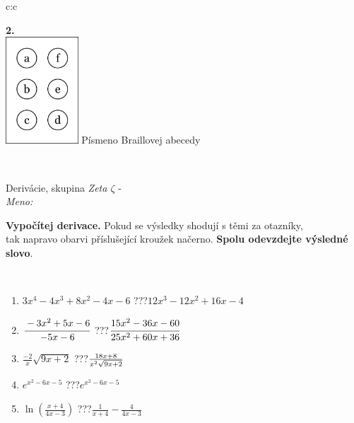 \documentclass[10pt]{report}
\begin{document}
\begin{tabular}{c:c}
\begin{minipage}[c][104.5mm][t]{0.5\linewidth}
\begin{center}
\begin{minipage}{0.20\linewidth}
\begin{center}
{\Huge\bfseries 2.} \\[2mm]
\includegraphics[height=40mm]{../images/braille.png}
{\small Písmeno Braillovej abecedy}
\end{center}
\end{minipage}
\end{center}
\end{minipage}
\\ \hdashline
\begin{minipage}[c][104.5mm][t]{0.5\linewidth}
\begin{center}
\vspace{7mm}
{\huge Derivácie, skupina \textit{Zeta $\zeta$} -}\\[5mm]
\textit{Meno:}\phantom{xxxxxxxxxxxxxxxxxxxxxxxxxxxxxxxxxxxxxxxxxxxxxxxxxxxxxxxxxxxxxxxxx}\\[5mm]
\begin{minipage}{0.95\linewidth}
\begin{center}
\textbf{Vypočítej derivace.} Pokud se výsledky shodují s těmi za otazníky,\\tak napravo obarvi příslušející kroužek načerno. \textbf{Spolu odevzdejte výsledné slovo}.
\end{center}
\end{minipage}
\\[1mm]
\begin{minipage}{0.79\linewidth}
\begin{center}
\begin{varwidth}{\linewidth}
\begin{enumerate}
\normalsize
\item $3x^4-4x^3+8x^2-4x-6$\quad \dotfill\; ???\;\dotfill \quad $12x^3-12x^2+16x-4$
\item $\cfrac{-3x^2+5x-6}{-5x-6}$\quad \dotfill\; ???\;\dotfill \quad $\cfrac{15x^2-36x-60}{25x^2+60x+36}$
\item $\frac{-2}{x}\sqrt{9x+2}$\quad \dotfill\; ???\;\dotfill \quad $\frac{18x+8}{x^2 \sqrt{\smash[b]{9x+2}}}$
\item $e^{x^2-6x-5}$\quad \dotfill\; ???\;\dotfill \quad $e^{x^2-6x-5}$
\item $\ln{\left(\frac{x+4}{4x-3}\right)}$\quad \dotfill\; ???\;\dotfill \quad $\frac{1}{x+4}-\frac{4}{4x-3}$

\end{enumerate}
\end{varwidth}
\end{center}
\end{minipage}
\end{center}
\end{minipage}
\end{tabular}
\end{document}
